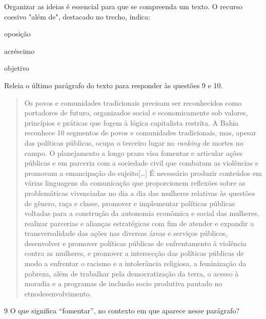 Organizar as ideias é essencial para que se compreenda um texto. O recurso coesivo "além de", destacado no trecho, indica:

\begin{boxlist}
 oposição

 acréscimo

 objetivo
\end{boxlist}

Releia o último parágrafo do texto para responder às questões 9 e 10.

\begin{quote}
Os povos e comunidades tradicionais precisam ser reconhecidos como
portadores de futuro, organizados social e economicamente sob valores,
princípios e práticas que fogem à lógica capitalista restrita. A Bahia
reconhece 10 segmentos de povos e comunidades tradicionais, mas, apesar
das políticas públicas, ocupa o terceiro lugar no \emph{ranking} de
mortes no campo. O planejamento a longo prazo visa fomentar e articular
ações públicas e em parceria com a sociedade civil que combatam as
violências e promovam a emancipação do sujeito{[}\ldots{}{]} É
necessário produzir conteúdos em várias linguagens da comunicação que
proporcionem reflexões sobre as problemáticas vivenciadas no dia a dia
das mulheres relativas às questões de gênero, raça e classe, promover e
implementar políticas públicas voltadas para a construção da autonomia
econômica e social das mulheres, realizar parcerias e alianças
estratégicas com fim de atender e expandir a transversalidade das ações
nas diversas áreas e serviços públicos, desenvolver e promover políticas
públicas de enfrentamento à violência contra as mulheres, e promover a
intersecção das políticas públicas de modo a enfrentar o racismo e a
intolerância religiosa, a feminização da pobreza, além de trabalhar pela
democratização da terra, o acesso à moradia e a programas de inclusão
socio produtiva pautado no etnodesenvolvimento.
\end{quote}

\num{9} O que significa ``fomentar'', no contexto em que aparece nesse parágrafo?


